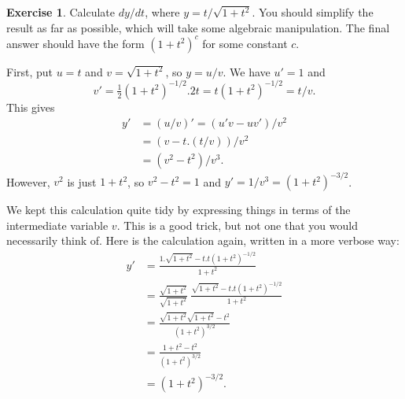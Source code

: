 \documentclass[a4paper]{book}
\renewcommand{\:}{\colon}
\theoremstyle{definition}
\newtheorem{exercise}[theorem]{Exercise}
\renewenvironment{solution}{\SolutionInline}{\endSolutionInline}
\begin{document}
\begin{exercise}
 Calculate $dy/dt$, where $y=t/\sqrt{1+t^2}$.  You should simplify
 the result as far as possible, which will take some algebraic
 manipulation.  The final answer should have the form $(1+t^2)^c$ for
 some constant $c$.
\end{exercise}
\begin{solution}
 First, put $u=t$ and $v=\sqrt{1+t^2}$, so $y=u/v$.  We have $u'=1$
 and 
 \[ v' = \tfrac{1}{2}(1+t^2)^{-1/2}.2t = t(1+t^2)^{-1/2} = t/v. \]
 This gives
 \begin{align*}
  y' &= (u/v)' = (u'v-uv')/v^2 \\
     &= (v-t.(t/v))/v^2 \\
     &= (v^2-t^2)/v^3.
 \end{align*}
 However, $v^2$ is just $1+t^2$, so $v^2-t^2=1$ and
 $y'=1/v^3=(1+t^2)^{-3/2}$. 

 We kept this calculation quite tidy by expressing things in terms of
 the intermediate variable $v$.  This is a good trick, but not one
 that you would necessarily think of.  Here is the calculation again,
 written in a more verbose way:
 \begin{align*}
  y' &= \frac{1.\sqrt{1+t^2}-t.t(1+t^2)^{-1/2}}{1+t^2} \\
     &= \frac{\sqrt{1+t^2}}{\sqrt{1+t^2}}\;
        \frac{\sqrt{1+t^2}-t.t(1+t^2)^{-1/2}}{1+t^2} \\
     &= \frac{\sqrt{1+t^2}\sqrt{1+t^2}-t^2}{(1+t^2)^{3/2}} \\
     &= \frac{1+t^2-t^2}{(1+t^2)^{3/2}} \\
     &= (1+t^2)^{-3/2}.
 \end{align*}
\end{solution}
\end{document}
